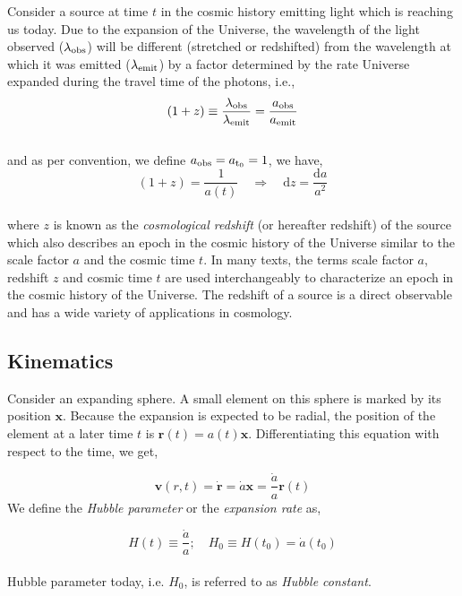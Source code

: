 \documentclass[
  11pt,
  twoside,
  openright,
  titlepage,
  headings=optiontoheadandtoc
]{scrbook}
\begin{document}
Consider a source at time $t$ in the cosmic history emitting light which is reaching us today. 
Due to the expansion of the Universe, the wavelength of the light observed 
($\lambda_{\rm obs}$) will be different (stretched or redshifted) from the 
wavelength at which it was emitted ($\lambda_{\rm emit}$) by a factor determined by the rate 
Universe expanded during the travel time of the photons, i.e.,
\begin{equation}
	(1+z) \equiv \dfrac{\lambda_{\rm obs}}{\lambda_{\rm emit}} = \dfrac{a_{\rm obs}}{a_{\rm emit}}
\end{equation}
\\
and as per convention, we define $a_{\rm obs} = a_{\rm t_0} = 1$, we have,
\begin{equation}
	(1+z) = \dfrac{1}{a(t)} \quad \Rightarrow \quad \mathrm{d}z = \dfrac{\mathrm{d}a}{a^2}
\end{equation}
\\
where $z$ is known as the {\it cosmological redshift} (or hereafter redshift) 
of the source which also describes
an epoch in the cosmic history of the Universe similar to the scale factor $a$ and
the cosmic time $t$. In many texts, the terms scale factor 
$a$, redshift $z$ and cosmic time $t$ are used interchangeably to
characterize an epoch in the cosmic history of the Universe. The redshift
of a source is a direct observable and has a wide variety of 
applications in cosmology.



\subsection{Kinematics}


Consider an expanding sphere. A small element on this sphere is marked by
its position $\mathbf{x}$. Because the expansion is expected to be radial, the
position of the element at a later time $t$ is $\mathbf{r}(t) = a(t) \mathbf{x}$. Differentiating 
this equation with respect to the time, we get,

\begin{equation}
	\mathbf{v}(r,t) = \dot{\mathbf{r}} = \dot{a} \mathbf{x} = \dfrac{\dot{a}}{a} \mathbf{r}(t)
	\label{eqn:hubble}
\end{equation}
We define the {\em Hubble parameter} or the {\em expansion rate} as,

\begin{equation}
	H(t) \equiv \dfrac{\dot{a}}{a};\quad H_0 \equiv H(t_0) = \dot{a}(t_0)
\end{equation}
\\
Hubble parameter today, i.e. $H_0$, is referred to as {\em Hubble constant}. 
\end{document}
